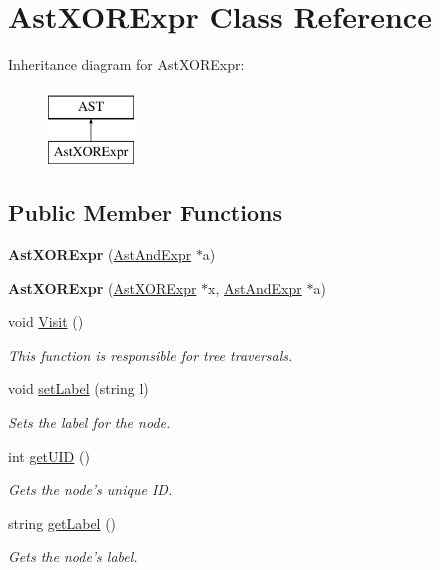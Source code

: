 \hypertarget{classAstXORExpr}{\section{Ast\-X\-O\-R\-Expr Class Reference}
\label{classAstXORExpr}
}
Inheritance diagram for Ast\-X\-O\-R\-Expr\-:\begin{figure}[H]
\begin{center}
\leavevmode
\includegraphics[height=2.000000cm]{classAstXORExpr}
\end{center}
\end{figure}
\subsection*{Public Member Functions}
\begin{DoxyCompactItemize}
\item 
\hypertarget{classAstXORExpr_a04ca42d403c3e4d69a0b9c6e22aff25b}{{\bfseries Ast\-X\-O\-R\-Expr} (\hyperlink{classAstAndExpr}{Ast\-And\-Expr} $\ast$a)}\label{classAstXORExpr_a04ca42d403c3e4d69a0b9c6e22aff25b}

\item 
\hypertarget{classAstXORExpr_a1481a0957bc4aee1819caa848f2f5a2d}{{\bfseries Ast\-X\-O\-R\-Expr} (\hyperlink{classAstXORExpr}{Ast\-X\-O\-R\-Expr} $\ast$x, \hyperlink{classAstAndExpr}{Ast\-And\-Expr} $\ast$a)}\label{classAstXORExpr_a1481a0957bc4aee1819caa848f2f5a2d}

\item 
void \hyperlink{classAstXORExpr_a6742a6024309a1359fe029204ca50c4f}{Visit} ()
\begin{DoxyCompactList}\small\item\em This function is responsible for tree traversals. \end{DoxyCompactList}\item 
void \hyperlink{classAST_a71d680856e95ff89f55d5311a552eba6}{set\-Label} (string l)
\begin{DoxyCompactList}\small\item\em Sets the label for the node. \end{DoxyCompactList}\item 
int \hyperlink{classAST_ab7a5b1d9f1c2de0d98deb356f724a42c}{get\-U\-I\-D} ()
\begin{DoxyCompactList}\small\item\em Gets the node's unique I\-D. \end{DoxyCompactList}\item 
string \hyperlink{classAST_aee029be902fffc927d16ccb03eb922ad}{get\-Label} ()
\begin{DoxyCompactList}\small\item\em Gets the node's label. \end{DoxyCompactList}\end{DoxyCompactItemize}
